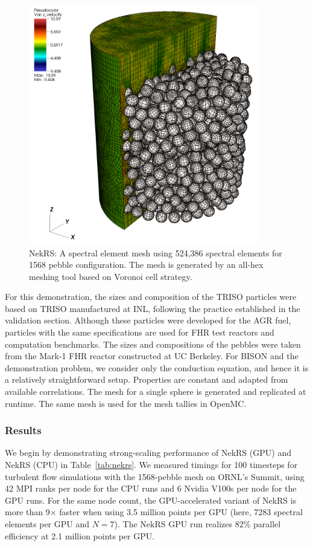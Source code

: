 \begin{figure}[!h]
\centering
\includegraphics[clip=true,width=0.9\textwidth]{Figures/ndemo_r1}
\caption{NekRS: A spectral element mesh using 524,386 spectral elements for 1568 pebble configuration.
         The mesh is generated by an all-hex meshing tool based on Voronoi cell strategy.}
\label{f:ndemo1}
\end{figure}

For this demonstration, the sizes and composition of the TRISO particles were
based on TRISO manufactured at INL, following the practice established in the
validation section. Although these particles were developed for the AGR fuel,
particles with the same specifications are used for FHR test reactors and
computation benchmarks. The sizes and compositions of the pebbles were taken
from the Mark-1 FHR reactor constructed at UC Berkeley. For BISON and the
demonstration problem, we consider only the conduction equation, and hence  it
is a relatively straightforward setup. Properties are constant and adapted from
available correlations. The mesh for a single sphere is generated and
replicated at runtime. The same mesh is used for the mesh tallies in OpenMC.

\subsubsection{Results}
We begin by demonstrating strong-scaling performance of NekRS (GPU) and NekRS
(CPU) in Table~\ref{tab:nekrs}.  We measured timings for 100 timesteps for
turbulent flow simulations with the 1568-pebble mesh on ORNL's Summit, using 42
MPI ranks per node for the CPU runs and 6 Nvidia V100s per node for the GPU
runs.  For the same node count, the GPU-accelerated variant of NekRS is more
than 9$\times$ faster when using 3.5 million points per GPU (here, 7283
spectral elements per GPU and $N=7$).  The NekRS GPU run realizes 82\%
parallel efficiency at 2.1 million points per GPU.


